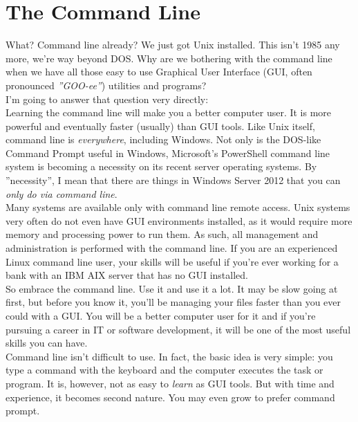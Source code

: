 \chapter{The Command Line}

What?  Command line already?  We just got Unix installed.  This isn't 1985 any more, we're way beyond DOS.  Why are we bothering with the command line when we have all those easy to use Graphical User Interface (GUI, often pronounced \textit{''GOO-ee''}) utilities and programs?\\

I'm going to answer that question very directly:\\

Learning the command line will make you a better computer user.  It is more powerful and eventually faster (usually) than GUI tools.  Like Unix itself, command line is \textit{everywhere}, including Windows.  Not only is the DOS-like Command Prompt useful in Windows, Microsoft's PowerShell command line system is becoming a necessity on its recent server operating systems.  By ''necessity'', I mean that there are things in Windows Server 2012 that you can \textit{only do via command line}.\\

Many systems are available only with command line remote access.  Unix systems very often do not even have GUI environments installed, as it would require more memory and processing power to run them.  As such, all management and administration is performed with the command line.  If you are an experienced Linux command line user, your skills will be useful if you're ever working for a bank with an IBM AIX server that has no GUI installed.\\

So embrace the command line.  Use it and use it a lot.  It may be slow going at first, but before you know it, you'll be managing your files faster than you ever could with a GUI.  You will be a better computer user for it and if you're pursuing a career in IT or software development, it will be one of the most useful skills you can have.\\

Command line isn't difficult to use.  In fact, the basic idea is very simple: you type a command with the keyboard and the computer executes the task or program.  It is, however, not as easy to \textit{learn} as GUI tools.  But with time and experience, it becomes second nature.  You may even grow to prefer command prompt.\\

